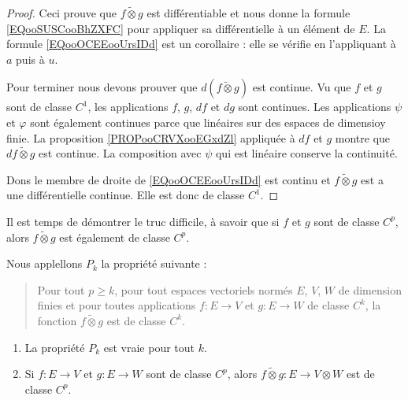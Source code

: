 \begin{proof}
    Ceci prouve que \( f\tilde\otimes g\) est différentiable et nous donne la formule \eqref{EQooSUSCooBhZXFC} pour appliquer sa différentielle à un élément de \( E\). La formule \eqref{EQooOCEEooUrsIDd} est un corollaire : elle se vérifie en l'appliquant à \( a\) puis à \( u\).
    
    Pour terminer nous devons prouver que \( d(f\tilde\otimes g)\) est continue. Vu que \( f\) et \( g\) sont de classe \( C^1\), les applications \( f\), \( g\), \( df\) et \( dg\) sont continues. Les applications \( \psi\) et \( \varphi\) sont également continues parce que linéaires sur des espaces de dimensioy finie. La proposition \ref{PROPooCRVXooEGxdZl} appliquée à \( df\) et \( g\) montre que \( df\tilde\otimes g\) est continue. La composition avec \( \psi\) qui est linéaire conserve la continuité.

    Dons le membre de droite de \eqref{EQooOCEEooUrsIDd} est continu et \( f\tilde\otimes g\) est a une différentielle continue. Elle est donc de classe \( C^1\).
\end{proof}

Il est temps de démontrer le truc difficile, à savoir que si \( f\) et \( g\) sont de classe \( C^p\), alors \( f\tilde\otimes g\) est également de classe \( C^p\). 

\begin{proposition}     \label{PROPooAWZFooMlhoCN}
    Nous applellons \( P_k\) la propriété suivante :
    \begin{quote}
        Pour tout \( p\geq k\), pour tout espaces vectoriels normés \( E\), \( V\), \( W\) de dimension finies et pour toutes applications \( f\colon E\to V\) et \( g\colon E\to W\) de classe \( C^k\), la fonction \( f\tilde\otimes g\) est de classe \( C^k\).
    \end{quote}
    \begin{enumerate}
        \item       \label{ITEMooDQRYooAEdxrW}
            La propriété \( P_k\) est vraie pour tout \( k\).
        \item       \label{ITEMooUUIFooGDyTMM}
            Si \( f\colon E\to V\) et \( g\colon E\to W\) sont de classe \( C^p\), alors \( f\tilde\otimes g\colon E\to V\otimes W\) est de classe \( C^p\).
    \end{enumerate}
\end{proposition}

